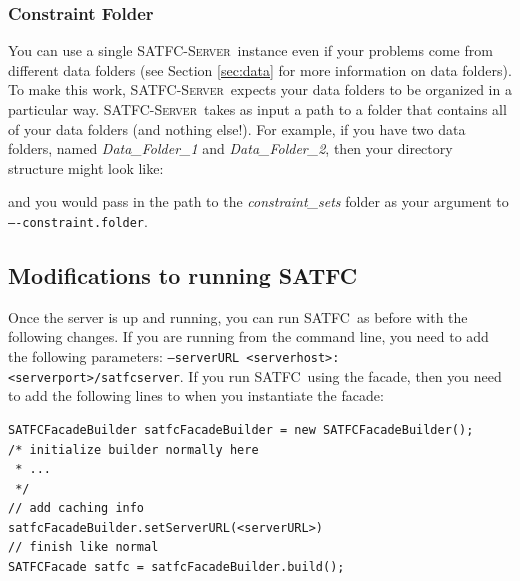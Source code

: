 \documentclass[
10pt, %
letterpaper, %
oneside, %
headinclude,footinclude, %
BCOR5mm, %
needspace, %
]{scrartcl}
\newcommand{\SATFC}{\textsc{SATFC}~}
\newcommand{\SATFCServer}{\textsc{SATFC-Server}~}
\begin{document}
\subsubsection{Constraint Folder}\label{subsubsec:ConstraintFolder}
You can use a single \SATFCServer instance even if your problems come from different data folders (see Section \ref{sec:data} for more information on data folders). To make this work, \SATFCServer expects your data folders to be organized in a particular way. \SATFCServer takes as input a path to a folder that contains all of your data folders (and nothing else!). For example, if you have two data folders, named \textit{Data\_Folder\_1} and \textit{Data\_Folder\_2}, then your directory structure might look like:


and you would pass in the path to the \textit{constraint\_sets} folder as your argument to \texttt{----constraint.folder}.

\subsection{Modifications to running \SATFC}
Once the server is up and running, you can run \SATFC as before with the following changes. If you are running from the command line, you need to add the following parameters: \texttt{---serverURL <serverhost>:<serverport>/satfcserver}. If you run \SATFC using the facade, then you need to add the following lines to when you instantiate the facade:

\begin{verbatim}
SATFCFacadeBuilder satfcFacadeBuilder = new SATFCFacadeBuilder();
/* initialize builder normally here
 * ...
 */
// add caching info
satfcFacadeBuilder.setServerURL(<serverURL>)
// finish like normal
SATFCFacade satfc = satfcFacadeBuilder.build();
\end{verbatim}
\end{document}
